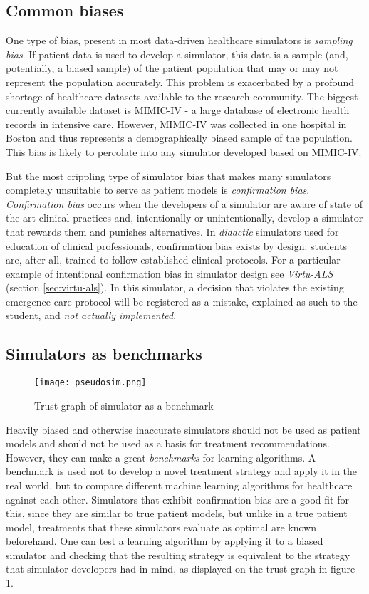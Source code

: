 \subsection{Common biases}
\label{sec:bias}

One type of bias, present in most data-driven healthcare simulators is \emph{sampling bias}.
If patient data is used to develop a simulator, this data is a sample (and, potentially, a biased sample) of the patient population that may or may not represent the population accurately.
This problem is exacerbated by a profound shortage of healthcare datasets available to the research community.
The biggest currently available dataset is MIMIC-IV \cite{mimic} - a large database of electronic health records in intensive care.
However, MIMIC-IV was collected in one hospital in Boston and thus represents a demographically biased sample of the population.
This bias is likely to percolate into any simulator developed based on MIMIC-IV.

But the most crippling type of simulator bias that makes many simulators completely unsuitable to serve as patient models is \emph{confirmation bias}.
\emph{Confirmation bias} occurs when the developers of a simulator are aware of state of the art clinical practices and, intentionally or unintentionally, develop a simulator that rewards them and punishes alternatives.  
In \emph{didactic} simulators used for education of clinical professionals, confirmation bias exists by design: students are, after all, trained to follow established clinical protocols.
For a particular example of intentional confirmation bias in simulator design see \emph{Virtu-ALS} (section \ref{sec:virtu-als}). 
In this simulator, a decision that violates the existing emergence care protocol will be registered as a mistake, explained as such to the student, and \emph{not actually implemented}.

\subsection{Simulators as benchmarks}

\begin{figure}
    \centering
    \texttt{[image: pseudosim.png]}
    \caption{Trust graph of simulator as a benchmark}
    \label{fig:benchmark}
\end{figure}

Heavily biased and otherwise inaccurate simulators should not be used as patient models and should not be used as a basis for treatment recommendations. 
However, they can make a great \emph{benchmarks} for learning algorithms.
A benchmark is used not to develop a novel treatment strategy and apply it in the real world, but to compare different machine learning algorithms for healthcare against each other. 
Simulators that exhibit confirmation bias are a good fit for this, since they are similar to true patient models, but unlike in a true patient model, treatments that these simulators evaluate as optimal are known beforehand. 
One can test a learning algorithm by applying it to a biased simulator and checking that the resulting strategy is equivalent to the strategy that simulator developers had in mind, as displayed on the trust graph in figure \ref{fig:benchmark}.

